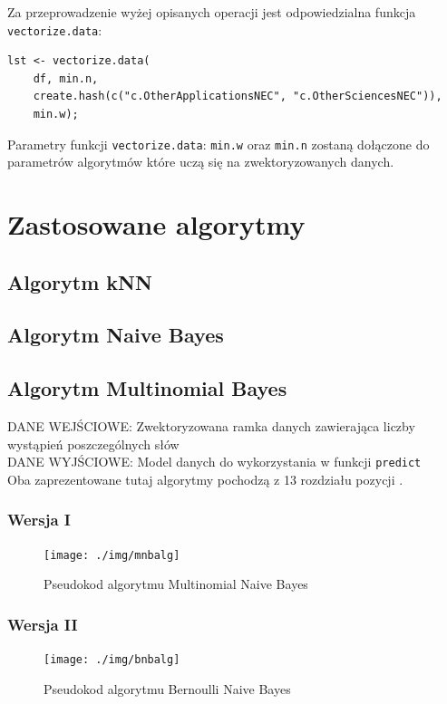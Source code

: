 \documentclass[a4paper,12pt]{article}
\begin{document}
		Za przeprowadzenie wyżej opisanych operacji jest
		odpowiedzialna funkcja \texttt{vectorize.data}:
		\begin{verbatim}
lst <- vectorize.data(
    df, min.n, 
    create.hash(c("c.OtherApplicationsNEC", "c.OtherSciencesNEC")),
    min.w);
		\end{verbatim}
		
		Parametry funkcji \texttt{vectorize.data}: \texttt{min.w} oraz
		\texttt{min.n} zostaną dołączone do parametrów algorytmów
		które uczą się na zwektoryzowanych danych.

\section{Zastosowane algorytmy}
	\subsection{Algorytm kNN}
	\subsection{Algorytm Naive Bayes}
	
	\subsection{Algorytm Multinomial Bayes}	
		\textsc{DANE WEJŚCIOWE}: Zwektoryzowana ramka danych zawierająca
		liczby wystąpień poszczególnych słów\\
		\textsc{DANE WYJŚCIOWE}: Model danych do wykorzystania w funkcji
		\texttt{predict}\\	
		
		Oba zaprezentowane tutaj algorytmy pochodzą z
		13 rozdziału pozycji \cite{irbook}.
	
		\subsubsection{Wersja I}
		\begin{figure}[!h]
			\centering
			\texttt{[image: ./img/mnbalg]}
			\caption{Pseudokod algorytmu Multinomial Naive Bayes}
		\end{figure}
		
		\subsubsection{Wersja II}
		\begin{figure}[!h]
			\centering
			\texttt{[image: ./img/bnbalg]}
			\caption{Pseudokod algorytmu Bernoulli Naive Bayes}
		\end{figure}		
\end{document}
